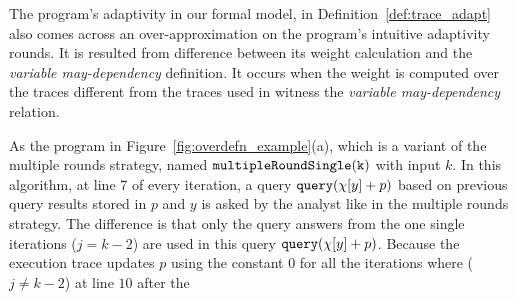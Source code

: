 \begin{example}
    \label{ex:overdefined_adapt}
    The program's adaptivity in our formal model,
    in Definition~\ref{def:trace_adapt} also
     comes across an over-approximation on the program's
     intuitive adaptivity rounds.
    It is resulted from difference between its weight calculation and the \emph{variable may-dependency} definition.
    It occurs when the weight is computed over the traces different from the traces used in 
    witness the \emph{variable may-dependency} relation.
    
    As the program in Figure~\ref{fig:overdefn_example}(a),
    which is a variant of the multiple rounds strategy, 
    named $\mathtt{multipleRoundSingle(k)}$ with input $k$.
    In this algorithm, 
    at line 7 of every iteration, 
    a query ${\tt query}(\chi[y] + p)$ based on previous query results stored in $p$ and $y$ is asked by the analyst like in the multiple rounds strategy. 
    The difference is that only the query answers from the one single iterations ($j = k - 2 $) are 
    used in this query ${\tt query}(\chi[y] + p)$.
    Because the execution trace updates 
    $p$ using the constant $0$ for all the iterations where ($j \neq k - 2$) at line $10$ after the 

\end{example}
